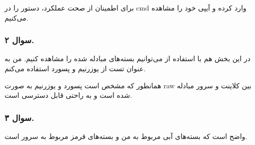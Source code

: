 برای اطمینان از صحت عملکرد، دستور 
را در cmd وارد کرده و آیپی خود را مشاهده می‌کنیم.
\subsubsection*{سوال ۲.}

در این بخش هم با استفاده از 
می‌توانیم بسته‌های مبادله شده را مشاهده کنیم. من به عنوان تست از یوزرنیم  و پسورد  استفاده می‌کنم.

{
}


همانطور که مشخص است پسورد و یوزرنیم به صورت raw بین کلاینت و سرور مبادله شده است و به راحتی قابل دسترسی است.


\pagebreak

\subsubsection*{سوال ۳.}


واضح است که بسته‌های آبی مربوط به من و بسته‌های قرمز مربوط به سرور است.

{
}

